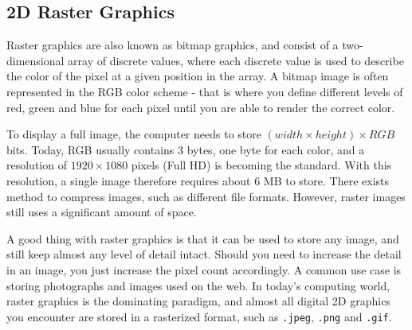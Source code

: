 \subsection{2D Raster Graphics}
Raster graphics are also known as bitmap graphics, and consist of a two-dimensional array of discrete values, where each discrete value is used to describe the color of the pixel at a given position in the array.
A bitmap image is often represented in the RGB color scheme - that is where you define different levels of red, green and blue for each pixel until you are able to render the correct color.

To display a full image, the computer needs to store \( (width \times height) \times RGB \) bits.
Today, RGB usually contains 3 bytes, one byte for each color, and a resolution of \(1920 \times 1080\) pixels (Full HD) is becoming the standard.
With this resolution, a single image therefore requires about 6 MB to store.
There exists method to compress images, such as different file formats. 
However, raster images still uses a significant amount of space.

A good thing with raster graphics is that it can be used to store any image, and still keep almost any level of detail intact. 
Should you need to increase the detail in an image, you just increase the pixel count accordingly. 
A common use case is storing photographs and images used on the web. 
In today's computing world, raster graphics is the dominating paradigm, and almost all digital 2D graphics you encounter are stored in a rasterized format, such as \texttt{.jpeg}, \texttt{.png} and \texttt{.gif}.